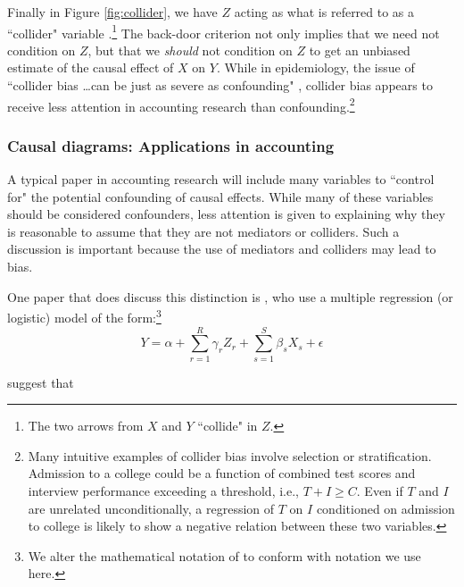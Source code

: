\documentclass[12pt,reqno,titlepage]{amsart}
\begin{document}
\begin{doublespace}
Finally in Figure \ref{fig:collider}, we have $Z$ acting as what is referred to as a ``collider" variable \citep{Glymour:2008aa,Pearl:2009kh}.\footnote{
The two arrows from $X$ and $Y$ ``collide" in $Z$.} 
The back-door criterion not only implies that we need not condition on $Z$, but that we \emph{should} not condition on $Z$ to get an unbiased estimate of the causal effect of $X$ on $Y$.
While in epidemiology, the issue of ``collider bias \dots can be just as severe as confounding" \citep[p.\,186]{Glymour:2008aa}, collider bias appears to receive less attention in accounting research than confounding.\footnote{
Many intuitive examples of collider bias involve selection or stratification.
Admission to a college could be a function of combined test scores and interview performance exceeding a threshold, i.e., $T + I \geq C$. Even if $T$ and $I$ are unrelated unconditionally, a regression of $T$ on $I$ conditioned on admission to college is likely to show a negative relation between these two variables.}

\subsubsection{Causal diagrams: Applications in accounting}
A typical paper in accounting research will include many variables  to ``control for" the potential confounding of causal effects.
While many of these variables should be considered confounders, less attention is given to explaining why they is reasonable to assume that they are not mediators or colliders.
Such a discussion is important because the use of mediators and colliders may lead to bias.

One paper that does discuss this distinction is \citet{Larcker:2007aa}, who use a multiple regression (or logistic) model of the form:\footnote{We alter the mathematical notation of  \citet{Larcker:2007aa} to conform with notation we use here.}
\begin{equation}
Y = \alpha + \sum_{r=1}^R \gamma _r Z_r + \sum_{s=1}^S \beta_s X_s + \epsilon \label{eqn:lrt1}
\end{equation}

\noindent \citet{Larcker:2007aa} suggest that 


\end{doublespace}
\end{document}
